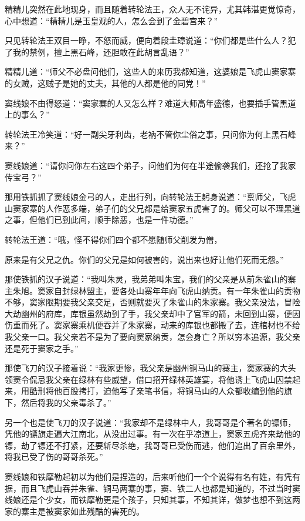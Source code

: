 \documentclass[12pt,oneside]{book}
\begin{document}
精精儿突然在此地现身，而且随着转轮法王，众人无不诧异，尤其韩湛更觉惊奇，心中想道：``精精儿是玉皇观的人，怎么会到了金碧宫来？''

只见转轮法王双目一睁，不怒而威，便向着段圭璋说道：``你们都是些什么人？犯了我的禁例，擅上黑石峰，还胆敢在此胡言乱语？''

精精儿道：``师父不必盘问他们，这些人的来历我都知道，这婆娘是飞虎山窦家寨的女贼，这贼子是她的丈夫，其他的人都是他的同党！''

窦线娘不由得怒道：``窦家寨的人又怎么样？难道大师高年盛德，也要插手管黑道上的事么？''

转轮法王冷笑道：``好一副尖牙利齿，老衲不管你尘俗之事，只问你为何上黑石峰来？''

窦线娘道：``请你问你左右这四个弟子，问他们为何在半途偷袭我们，还抢了我家传宝弓？''

那用铁抓抓了窦线娘金弓的人，走出行列，向转轮法王躬身说道：``禀师父，飞虎山窦家寨的人作恶多端，弟子们的父兄都是给窦家五虎害了的。师父可以不理黑道之事，但他们已到此间，顺手除恶，也是一件功德。''

转轮法王道：``哦，怪不得你们四个都不愿随师父削发为僧，

原来是有父兄之仇。你们的父兄是如何被害的，说出来也好让他们死而无怨。''

那使铁抓的汉子说道：``我叫朱灵，我弟弟叫朱宝，我们的父亲是从前朱雀山的寨主朱旭。窦家自封绿林盟主，要各处山寨年年向飞虎山纳贡。有一年朱雀山的贡物不够，窦家限期要我父亲交足，否则就要灭了朱雀山的朱家寨。我父亲没法，冒险大劫幽州的府库，库银虽然劫到了手，我父亲却中了官军的箭，未回到山寨，便因伤重而死了。窦家寨乘机便吞并了朱家寨，动来的库银也都搬了去，连棺材也不给我父亲一口。我父亲若不是为了要向窦家纳贡，怎会身亡？所以穷本追源，我父亲还是死于窦家之手。''

那使飞刀的汉子接着说：``我家更惨，我父亲是幽州铜马山的寨主，窦家寨的大头领窦令侃忌我父亲在绿林有些威望，借口招开绿林英雄宴，将他诱上飞虎山囚禁起来，用酷刑将他百股拷打，迫他写了亲笔书信，将铜马山的人众都收编到他的旗下，然后将我的父亲毒杀了。''

另一个也是使飞刀的汉子说道：``我家却不是绿林中人，我哥哥是个著名的镖师，凭他的镖旗走遍大江南北，从没出过事。有一次在乎凉道上，窦家五虎齐来劫他的镖，劫了镖还不打紧，还要斩尽杀绝，我哥哥已受伤而逃，他们追出了百余里外，将我已受了伤的哥哥杀死。''

窦线娘和铁摩勒起初以为他们是捏造的，后来听他们一个个说得有名有姓，有凭有据，而且飞虎山吞并朱雀、铜马两寨的事，窦、铁二人也都是知道的，不过当时窦线娘还是个少女，而铁摩勒更是个孩子，只知其事，不知其详，做梦也想不到这两家的寨主是被窦家如此残酷的害死的。
\end{document}
